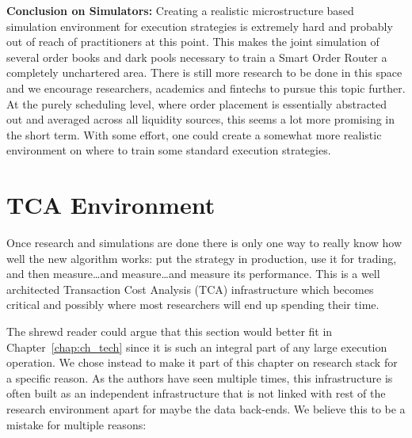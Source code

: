 \noindent\textbf{Conclusion on Simulators:} Creating a realistic microstructure based simulation environment for execution strategies is extremely hard and probably out of reach of practitioners at this point. This makes the joint simulation of several order books and dark pools necessary to train a Smart Order Router a completely unchartered area. There is still more research to be done in this space and we encourage researchers, academics and fintechs to pursue this topic further. At the purely scheduling level, where order placement is essentially abstracted out and averaged across all liquidity sources, this seems a lot more promising in the short term. With some effort, one could create a somewhat more realistic environment on where to train some standard execution strategies.



\section{TCA Environment\label{sec:tca_envir}}

Once research and simulations are done there is only one way to really know how well the new algorithm works: put the strategy in production, use it for trading, and then measure\dots and measure\dots and measure its performance. This is a well architected Transaction Cost Analysis (TCA) infrastructure which becomes critical and possibly where most researchers will end up spending their time. 


The shrewd reader could argue that this section would better fit in Chapter~\ref{chap:ch_tech} since it is such an integral part of any large execution operation. We chose instead to make it part of this chapter on research stack for a specific reason. As the authors have seen multiple times, this infrastructure is often built as an independent infrastructure that is not linked with rest of the research environment apart for maybe the data back-ends. We believe this to be a mistake for multiple reasons:


